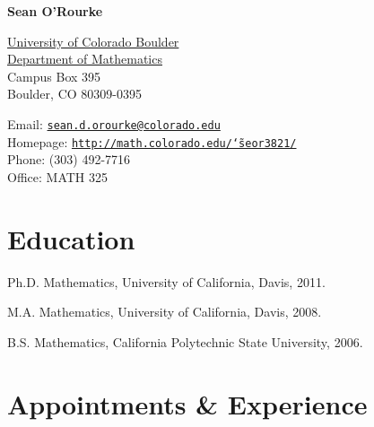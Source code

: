 \documentclass[letterpaper]{article}
\def\name{Sean O'Rourke}
\renewenvironment{itemize}{
  \begin{list}{}{
    \setlength{\leftmargin}{1em}
  }
}{
  \end{list}
}
\begin{document}
\centerline{\huge\bf \name}

\vspace{0.25in}

\begin{minipage}[t]{0.5\textwidth}
  \href{http://www.colorado.edu/}{University of Colorado Boulder } \\
  \href{http://math.colorado.edu/}{Department of Mathematics} \\
  Campus Box 395 \\
  Boulder, CO 80309-0395 
\end{minipage}
\begin{minipage}[t]{0.5\textwidth}
  Email: \href{mailto:sean.d.orourke@colorado.edu}{\tt sean.d.orourke@colorado.edu} \\
  Homepage: \href{http://math.colorado.edu/~seor3821/}{\tt http://math.colorado.edu/\char`\~seor3821/} \\
  Phone:  (303) 492-7716 \\
  Office: MATH 325 \\
\end{minipage}

\section*{Education}

\begin{itemize}
  \item Ph.D. Mathematics, University of California, Davis, 2011. 

  \item M.A. Mathematics, University of California, Davis, 2008.

  \item B.S. Mathematics, California Polytechnic State University, 2006.

\end{itemize}


\section*{Appointments \& Experience}
\end{document}
